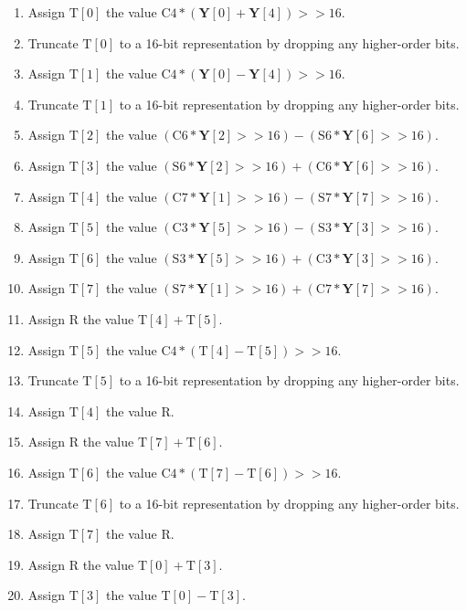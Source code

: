 \documentclass[9pt,letterpaper]{book}
\newcommand{\bitvar}[1]{\ensuremath{\mathbf{\bm{#1}}}}
\newcommand{\locvar}[1]{\ensuremath{\mathrm{#1}}}
\numberwithin{equation}{chapter}
\numberwithin{figure}{chapter}
\numberwithin{table}{chapter}
\begin{document}
\begin{enumerate}
\item
Assign $\locvar{T}[0]$ the value
 $\locvar{C4}*(\bitvar{Y}[0]+\bitvar{Y}[4])>>16$.
\item
Truncate $\locvar{T}[0]$ to a 16-bit representation by dropping any
 higher-order bits.
\item
Assign $\locvar{T}[1]$ the value
 $\locvar{C4}*(\bitvar{Y}[0]-\bitvar{Y}[4])>>16$.
\item
Truncate $\locvar{T}[1]$ to a 16-bit representation by dropping any
 higher-order bits.
\item
Assign $\locvar{T}[2]$ the value $(\locvar{C6}*\bitvar{Y}[2]>>16)-
 (\locvar{S6}*\bitvar{Y}[6]>>16)$.
\item
Assign $\locvar{T}[3]$ the value $(\locvar{S6}*\bitvar{Y}[2]>>16)+
 (\locvar{C6}*\bitvar{Y}[6]>>16)$.
\item
Assign $\locvar{T}[4]$ the value $(\locvar{C7}*\bitvar{Y}[1]>>16)-
 (\locvar{S7}*\bitvar{Y}[7]>>16)$.
\item
Assign $\locvar{T}[5]$ the value $(\locvar{C3}*\bitvar{Y}[5]>>16)-
 (\locvar{S3}*\bitvar{Y}[3]>>16)$.
\item
Assign $\locvar{T}[6]$ the value $(\locvar{S3}*\bitvar{Y}[5]>>16)+
 (\locvar{C3}*\bitvar{Y}[3]>>16)$.
\item
Assign $\locvar{T}[7]$ the value $(\locvar{S7}*\bitvar{Y}[1]>>16)+
 (\locvar{C7}*\bitvar{Y}[7]>>16)$.
\item
Assign \locvar{R} the value $\locvar{T}[4]+\locvar{T}[5]$.
\item
Assign $\locvar{T}[5]$ the value
 $\locvar{C4}*(\locvar{T}[4]-\locvar{T}[5])>>16$.
\item
Truncate $\locvar{T}[5]$ to a 16-bit representation by dropping any
 higher-order bits.
\item
Assign $\locvar{T}[4]$ the value $\locvar{R}$.
\item
Assign \locvar{R} the value $\locvar{T}[7]+\locvar{T}[6]$.
\item
Assign $\locvar{T}[6]$ the value
 $\locvar{C4}*(\locvar{T}[7]-\locvar{T}[6])>>16$.
\item
Truncate $\locvar{T}[6]$ to a 16-bit representation by dropping any
 higher-order bits.
\item
Assign $\locvar{T}[7]$ the value $\locvar{R}$.
\item
Assign \locvar{R} the value $\locvar{T}[0]+\locvar{T}[3]$.
\item
Assign $\locvar{T}[3]$ the value $\locvar{T}[0]-\locvar{T}[3]$.

\end{enumerate}
\end{document}
